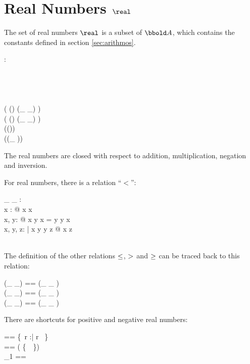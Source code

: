 \documentclass[12pt]{article}
\begin{document}
\section{Real Numbers $\real$}
\label{sec:real-numbers}
The set of real numbers $\real$ is a subset of $\arithmos$, which
contains the constants defined in section \ref{sec:arithmos}.
%
\begin{axdef}
  \real : \power \arithmos\\
  \where
  \azero \in \real\\
  \aone \in \real\\
  \atwo \in \real\\
  \aten \in \real\\
  \ran ( (\real \cross \real) \dres (\_ \aplus \_) ) \subset \real\\
  \ran ( (\real \cross \real) \dres (\_ \amult \_) ) \subset \real\\
  \ran (\real \dres (\aneg ))  \subset \real\\
  \ran (\real \dres (\_ \ainv ))  \subset \real\\
\end{axdef}

The real numbers are closed with respect to addition, multiplication,
negation and inversion.

For real numbers, there is a relation ``$<$'':
%
\begin{axdef}
  \_ \alt \_ : \real \rel \real\\
  \where
  \forall x : \real @ \lnot x \alt x\\
  \forall x, y: \real @ x \alt y \lor x = y \lor y \alt x\\
  \forall x, y, z: \real | x \alt y \land y \alt z @ x \alt z \\
  \azero \alt \aone\\
\end{axdef}
%
The definition of the other relations $\leq$, $>$ and $\geq$ can
be traced back to this relation:
%
\begin{zed}
  (\_ \aleq \_) == (\_ \alt \_ ) \cup \id \real \\
  (\_ \agt \_) == (\_ \alt \_ ) \inv \\
  (\_ \ageq \_) == (\_ \agt \_ ) \cup \id \real \\
\end{zed}
%
There are shortcuts for positive and negative real numbers:
%
\begin{zed}
  \realplus == \{~r :\real | r \agt \azero~\}\\
  \realminus == \real \setminus ( \realplus \cup \{~\azero~\})\\
  \real_1 == \realplus \cup \realminus \\
\end{zed}
%
\end{document}
